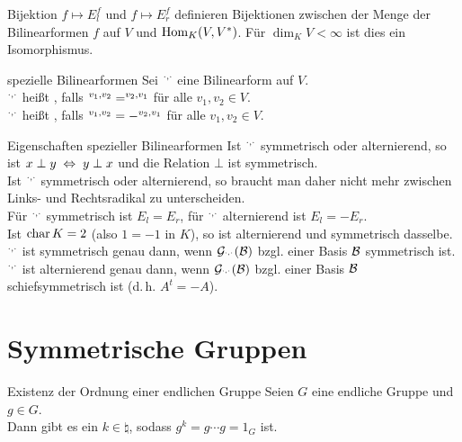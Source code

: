 \begin{Satz}{Bijektion}
    $f \mapsto E_l^f$ und $f \mapsto E_r^f$ definieren Bijektionen zwischen
    der Menge der Bilinearformen $f$ auf $V$ und $\operatorname{Hom}_K(V, V^\ast)$.
    Für $\dim_K V < \infty$ ist dies ein Isomorphismus.
\end{Satz}

\begin{Def}{spezielle Bilinearformen}
    Sei $\sp{\cdot, \cdot}$ eine Bilinearform auf $V$. \\
    $\sp{\cdot, \cdot}$ heißt , falls
    $\sp{v_1, v_2} = \sp{v_2, v_1}$ für alle $v_1, v_2 \in V$. \\
    $\sp{\cdot, \cdot}$ heißt , falls
    $\sp{v_1, v_2} = -\sp{v_2, v_1}$ für alle $v_1, v_2 \in V$.
\end{Def}

\begin{Lemma}{Eigenschaften spezieller Bilinearformen}
    Ist $\sp{\cdot, \cdot}$ symmetrisch oder alternierend, so ist
    $x \;\bot\; y \;\Leftrightarrow\; y \;\bot\; x$ und die Relation $\bot$ ist
    symmetrisch. \\
    Ist $\sp{\cdot, \cdot}$ symmetrisch oder alternierend, so braucht man
    daher nicht mehr zwischen Links- und Rechtsradikal zu unterscheiden. \\
    Für $\sp{\cdot, \cdot}$ symmetrisch ist $E_l = E_r$,
    für $\sp{\cdot, \cdot}$ alternierend ist $E_l = -E_r$. \\
    Ist $\operatorname{char} K = 2$ (also $1 = -1$ in $K$), so ist alternierend und
    symmetrisch dasselbe. \\
    $\sp{\cdot, \cdot}$ ist symmetrisch genau dann, wenn
    $\mathcal{G}_{\sp{\cdot, \cdot}}(\mathcal{B})$ bzgl. einer Basis $\mathcal{B}$
    symmetrisch ist. \\
    $\sp{\cdot, \cdot}$ ist alternierend genau dann, wenn
    $\mathcal{G}_{\sp{\cdot, \cdot}}(\mathcal{B})$ bzgl. einer Basis $\mathcal{B}$
    schiefsymmetrisch ist (d.\,h. $A^t = -A$).
\end{Lemma}

\section{%
    Symmetrische Gruppen%
}

\begin{Satz}{Existenz der Ordnung einer endlichen Gruppe}
    Seien $G$ eine endliche Gruppe und $g \in G$. \\
    Dann gibt es ein $k \in \natural$, sodass $g^k = g \dotsm g = 1_G$ ist.
\end{Satz}

